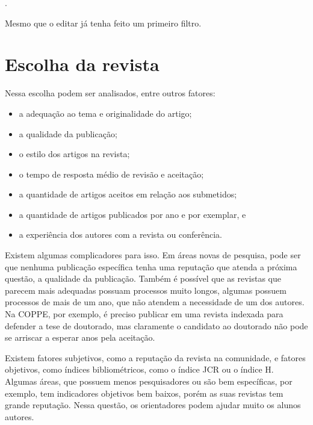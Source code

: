 \documentclass[openany]{book}
\begin{document}
.


 Mesmo que o editar já tenha feito um primeiro filtro.






\section{Escolha da revista}


Nessa escolha podem ser analisados, entre outros fatores:
\begin{itemize}
    \item a adequação ao tema e originalidade do artigo;
    \item a qualidade da publicação;
    \item o estilo dos artigos na revista;
    \item o tempo de resposta médio de revisão e aceitação;
    \item a quantidade de artigos aceitos em relação aos submetidos;
    \item a quantidade de artigos publicados por ano e por exemplar, e
    \item a experiência dos autores com a revista ou conferência.
\end{itemize}

 Existem algumas complicadores para isso. Em áreas novas de pesquisa, pode ser que nenhuma publicação específica tenha uma reputação que atenda a próxima questão, a qualidade da publicação. Também é possível que as revistas que parecem mais adequadas possuam processos muito longos, algumas possuem processos de mais de um ano, que não atendem a necessidade de um dos autores. Na COPPE, por exemplo, é preciso publicar em uma revista indexada para defender a tese de doutorado, mas claramente o candidato ao doutorado não pode se arriscar a esperar anos pela aceitação.

 Existem fatores subjetivos, como a reputação da revista na comunidade, e fatores objetivos, como índices bibliométricos, como o índice JCR ou o índice H. Algumas áreas, que possuem menos pesquisadores ou são bem específicas, por exemplo, tem indicadores objetivos bem baixos, porém as suas revistas tem grande reputação. Nessa questão, os orientadores podem ajudar muito os alunos autores.
\end{document}

